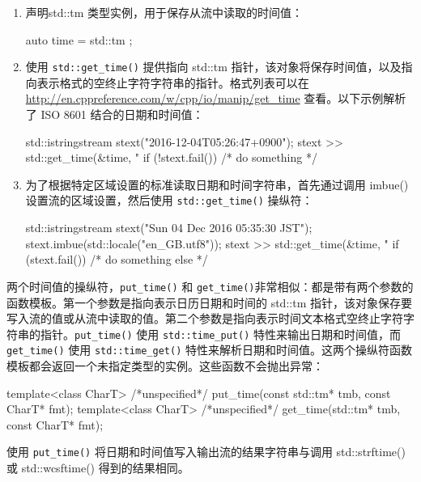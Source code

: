 \begin{enumerate}
\item
声明std::tm 类型实例，用于保存从流中读取的时间值：

\begin{cpp}
auto time = std::tm {};
\end{cpp}

\item
使用 \verb|std::get_time()| 提供指向 std::tm 指针，该对象将保存时间值，以及指向表示格式的空终止字符字符串的指针。格式列表可以在 \url{http://en.cppreference.com/w/cpp/io/manip/get_time} 查看。以下示例解析了 ISO 8601 结合的日期和时间值：

\begin{cpp}
std::istringstream stext("2016-12-04T05:26:47+0900");
stext >> std::get_time(&time, "%
if (!stext.fail()) { /* do something */ }
\end{cpp}

\item
为了根据特定区域设置的标准读取日期和时间字符串，首先通过调用 imbue() 设置流的区域设置，然后使用 \verb|std::get_time()| 操纵符：

\begin{cpp}
std::istringstream stext("Sun 04 Dec 2016 05:35:30 JST");
stext.imbue(std::locale("en_GB.utf8"));
stext >> std::get_time(&time, "%
if (stext.fail()) { /* do something else */ }
\end{cpp}
\end{enumerate}


两个时间值的操纵符，\verb|put_time()| 和 \verb|get_time()|非常相似：都是带有两个参数的函数模板。第一个参数是指向表示日历日期和时间的 std::tm 指针，该对象保存要写入流的值或从流中读取的值。第二个参数是指向表示时间文本格式空终止字符字符串的指针。\verb|put_time()| 使用 \verb|std::time_put()| 特性来输出日期和时间值，而 \verb|get_time()| 使用 \verb|std::time_get()| 特性来解析日期和时间值。这两个操纵符函数模板都会返回一个未指定类型的实例。这些函数不会抛出异常：

\begin{cpp}
template<class CharT>
/*unspecified*/ put_time(const std::tm* tmb, const CharT* fmt);
template<class CharT>
/*unspecified*/ get_time(std::tm* tmb, const CharT* fmt);
\end{cpp}

\begin{myTip}
使用 \verb|put_time()| 将日期和时间值写入输出流的结果字符串与调用 std::strftime() 或 std::wcsftime() 得到的结果相同。
\end{myTip}

